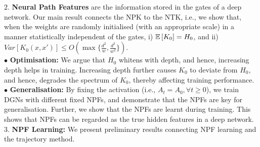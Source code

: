 $2.$ \textbf{Neural Path Features} are the information stored in the gates of a deep network. Our main result connects the NPK to the NTK, i.e., we show that, when the weights are randomly initialised (with an appropriate scale) in a manner statistically independent of the gates, i)  $\mathbb{E}\left[K_0\right]=H_0$, and ii) $Var\left[K_0(x,x')\right]\leq O(\max\{\frac{d^2}{w}, \frac{d^3}{w^2}\})$.\\
$\bullet$ \textbf{Optimisation:}   We argue that  $H_0$ whitens with depth, and hence, increasing depth helps in training. Increasing depth further causes $K_0$ to deviate from $H_0$, and hence, degrades the spectrum of $K_0$, thereby affecting training performance.\\
$\bullet$ \textbf{Generalisation:} By fixing the activation (i.e., $A_t=A_0,\forall t\geq 0$), we train DGNs with different fixed NPFs, and demonstrate that the NPFs are key for generalisation. Further, we show that the NPFs are learnt during training. This shows that NPFs can be regarded as the true hidden features in a deep network.\\
$3.$ \textbf{NPF Learning:} We present preliminary results connecting NPF learning and the trajectory method.

